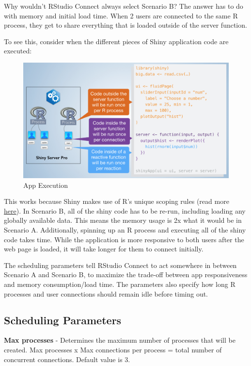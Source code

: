 \documentclass[]{book}
\theoremstyle{definition}
\theoremstyle{definition}
\theoremstyle{definition}
\theoremstyle{remark}
\begin{document}
Why wouldn't RStudio Connect always select Scenario B? The answer has to
do with memory and initial load time. When 2 users are connected to the
same R process, they get to share everything that is loaded outside of
the server function.

To see this, consider when the different pieces of Shiny application
code are executed:

\begin{figure}
\centering
\includegraphics{imgs/scaling/app-execution.png}
\caption{App Execution}
\end{figure}

This works because Shiny makes use of R's unique scoping rules (read
more \href{http://shiny.rstudio.com/articles/scoping.html}{here}). In
Scenario B, all of the shiny code has to be re-run, including loading
any globally available data. This means the memory usage is 2x what it
would be in Scenario A. Additionally, spinning up an R process and
executing all of the shiny code takes time. While the application is
more responsive to both users after the web page is loaded, it will take
longer for them to connect initially.

The scheduling parameters tell RStudio Connect to act somewhere in
between Scenario A and Scenario B, to maximize the trade-off between app
responsiveness and memory consumption/load time. The parameters also
specify how long R processes and user connections should remain idle
before timing out.

\hypertarget{scheduling-parameters}{%
\subsection{Scheduling Parameters}\label{scheduling-parameters}}

\textbf{Max processes} - Determines the maximum number of processes that
will be created. Max processes x Max connections per process = total
number of concurrent connections. Default value is 3.
\end{document}
